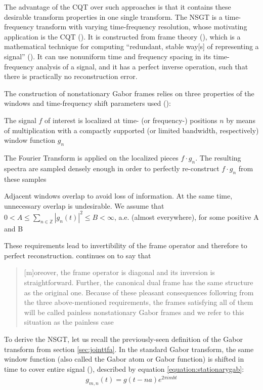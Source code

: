 \documentclass[report.tex]{subfiles}
\begin{document}
The advantage of the CQT over such approaches is that it contains these desirable transform properties in one single transform. The NSGT is a time-frequency transform with varying time-frequency resolution, whose motivating application is the CQT (\cite{jaillet, balazs}). It is constructed from frame theory (\cite{frametheory}), which is a mathematical technique for computing ``redundant, stable way[s] of representing a signal'' (\cite{framesintro}). It can use nonuniform time and frequency spacing in its time-frequency analysis of a signal, and it has a perfect inverse operation, such that there is practically no reconstruction error.

The construction of nonstationary Gabor frames relies on three properties of the windows and time-frequency shift parameters used (\cite{balazs}):
\begin{tight_itemize}
	\item
		The signal $f$ of interest is localized at time- (or frequency-) positions $n$ by means of multiplication with a compactly supported (or limited bandwidth, respectively) window function $g_{n}$
	\item
		The Fourier Transform is applied on the localized pieces $f \cdot g_{n}$. The resulting spectra are sampled densely enough in order to perfectly re-construct $f \cdot g_{n}$ from these samples
	\item
		Adjacent windows overlap to avoid loss of information. At the same time, unnecessary overlap is undesirable. We assume that $0 < A \le \sum_{n \in \mathbb{Z}}|g_{n}(t)|^{2} \le B < \infty$, a.e. (almost everywhere), for some positive A and B
\end{tight_itemize}

These requirements lead to invertibility of the frame operator and therefore to perfect reconstruction. \textcite{balazs} continues on to say that

\begin{quote}
	[m]oreover, the frame operator is diagonal and its inversion is straightforward. Further, the canonical dual frame has the same structure as the original one. Because of these pleasant consequences following from the three above-mentioned requirements, the frames satisfying all of them will be called painless nonstationary Gabor frames and we refer to this situation as the painless case
\end{quote}

To derive the NSGT, let us recall the previously-seen definition of the Gabor transform from section \ref{sec:jointtfa}. In the standard Gabor transform, the same window function (also called the Gabor atom or Gabor function) is shifted in time to cover entire signal (\cite{adaptivecqt}), described by equation \ref{equation:stationarygab}:
\begin{align} \tag{10}\label{equation:stationarygab}
g_{m, n}(t) = g(t - na)e^{2\pi i m b t}
\end{align}
\end{document}
